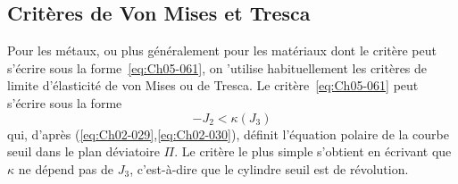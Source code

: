 \subsection{Critères de Von Mises et Tresca} \label{ssec:Ch05-3.2}
Pour les métaux, ou plus généralement pour les matériaux dont le critère peut s'écrire sous la forme~\eqref{eq:Ch05-061}, on 'utilise habituellement les critères de limite d'élasticité de von Mises ou de Tresca.
Le critère~\eqref{eq:Ch05-061} peut s'écrire sous la forme 
\begin{equation}
    -J_2 < \kappa\left( J_3 \right)
    \label{eq:Ch05-063}
\end{equation}
qui, d'après (\ref{eq:Ch02-029},\ref{eq:Ch02-030}), définit l'équation polaire de la courbe seuil dans le plan déviatoire  $\Pi$.
Le critère le plus simple s'obtient en écrivant que $\kappa$ ne dépend pas de $J_3$, c'est-à-dire que le cylindre seuil est de révolution.

